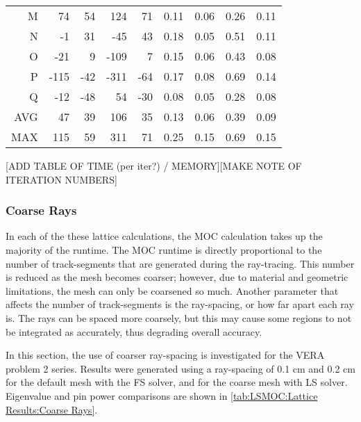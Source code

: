 {{{\begin{table}
\begin{tabular}{rrrrr@{\hskip 1cm}rrrr}
                M    & 74   &   54    &  124    & 71              & 0.11 & 0.06 & 0.26 & 0.11\\
                N    & -1   &   31    &  -45    & 43              & 0.18 & 0.05 & 0.51 & 0.11\\
                O    & -21  &   9     &  -109   & 7               & 0.15 & 0.06 & 0.43 & 0.08\\
                P    & -115 &   -42   &  -311   & -64             & 0.17 & 0.08 & 0.69 & 0.14\\
                Q    & -12  &   -48   &  54     & -30             & 0.08 & 0.05 & 0.28 & 0.08\\\midrule
                AVG  & 47   &   39    &  106    & 35              & 0.13 & 0.06 & 0.39 & 0.09\\
                MAX  & 115  &   59    &  311    & 71              & 0.25 & 0.15 & 0.69 & 0.15\\\bottomrule
        \end{tabular}
        \label{tab:LSMOC:Lattice Results}
      \end{table}

      [ADD TABLE OF TIME (per iter?) / MEMORY][MAKE NOTE OF ITERATION NUMBERS]

      \subsubsection{Coarse Rays}{\label{sssec:LSMOC:Coarse Rays}
        In each of the these lattice calculations, the \ac{MOC} calculation takes up the majority of the runtime.
        The \ac{MOC} runtime is directly proportional to the number of track-segments that are generated during the ray-tracing.
        This number is reduced as the mesh becomes coarser; however, due to material and geometric limitations, the mesh can only be coarsened so much.
        Another parameter that affects the number of track-segments is the ray-spacing, or how far apart each ray is.
        The rays can be spaced more coarsely, but this may cause some regions to not be integrated as accurately, thus degrading overall accuracy.

        In this section, the use of coarser ray-spacing is investigated for the \ac{VERA} problem 2 series.
        Results were generated using a ray-spacing of 0.1 cm and 0.2 cm for the default mesh with the \ac{FS} solver, and for the coarse mesh with \ac{LS} solver.
        Eigenvalue and pin power comparisons are shown in \cref{tab:LSMOC:Lattice Results:Coarse Rays}.

}}}}
